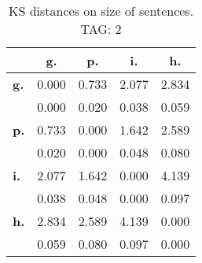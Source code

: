 \begin{table}[h!]
\begin{center}
\begin{tabular}{| l || c | c | c | c |}\hline
 & {\bf g.} & {\bf p.} & {\bf i.} & {\bf h.} \\\hline\hline
{\bf g.} & 0.000 & 0.733 & 2.077 & 2.834 \\
{\bf } & 0.000 & 0.020 & 0.038 & 0.059 \\\hline
{\bf p.} & 0.733 & 0.000 & 1.642 & 2.589 \\
{\bf } & 0.020 & 0.000 & 0.048 & 0.080 \\\hline
{\bf i.} & 2.077 & 1.642 & 0.000 & 4.139 \\
{\bf } & 0.038 & 0.048 & 0.000 & 0.097 \\\hline
{\bf h.} & 2.834 & 2.589 & 4.139 & 0.000 \\
{\bf } & 0.059 & 0.080 & 0.097 & 0.000 \\\hline
\end{tabular}
\caption{KS distances on size of sentences. TAG: 2}
\end{center}
\end{table}